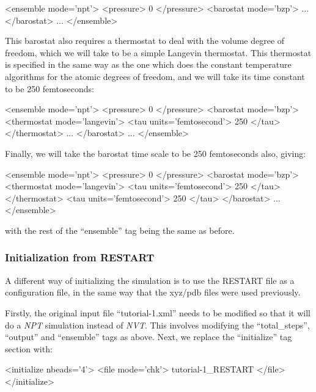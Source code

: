 \documentclass[11pt,english,fleqn]{report}
\newenvironment{code}{%
\footnotesize 
\verbatim
}{
\endverbatim
\normalsize
}
\begin{document}

\begin{code}
<ensemble mode='npt'>
   <pressure> 0 </pressure>
   <barostat mode='bzp'>
      ...
   </barostat>
   ...
</ensemble>
\end{code}

This barostat also requires a 
thermostat to deal with the volume degree of freedom, which we will take
to be a simple Langevin thermostat.
This thermostat is specified in the same way as the one which does the
constant temperature algorithms for the atomic degrees of freedom, and
we will take its time constant to be 250 femtoseconds:

\begin{code}
<ensemble mode='npt'>
   <pressure> 0 </pressure>
   <barostat mode='bzp'>
      <thermostat mode='langevin'>
         <tau units='femtosecond'> 250 </tau>
      </thermostat>
      ...
   </barostat>
   ...
</ensemble>
\end{code}

Finally, we will take the barostat time scale to be 250 femtoseconds also, giving:

\begin{code}
<ensemble mode='npt'>
   <pressure> 0 </pressure>
   <barostat mode='bzp'>
      <thermostat mode='langevin'>
         <tau units='femtosecond'> 250 </tau>
      </thermostat>
      <tau units='femtosecond'> 250 </tau>
   </barostat>
   ...
</ensemble>
\end{code}
with the rest of the {}``ensemble'' tag being the same as before.

\subsubsection{Initialization from RESTART}

A different way of initializing the simulation is to use the 
RESTART file as a configuration file, in the same way that
the xyz/pdb files were used previously.

Firstly, the original input file {}``tutorial-1.xml'' needs to
be modified so that
it will do a \emph{NPT} simulation instead of \emph{NVT}. This involves modifying
the {}``total\_steps'', {}``output'' and {}``ensemble'' tags as
above. Next, we replace the {}``initialize'' tag section with:

\begin{code}
<initialize nbeads='4'>
   <file mode='chk'> tutorial-1_RESTART </file>
</initialize>
\end{code}
\end{document}
